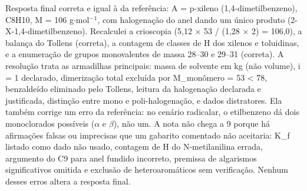 \documentclass{article}%
\begin{document}
Resposta final correta e igual à da referência: A = p{-}xileno (1,4{-}dimetilbenzeno), C8H10, M = 106 g$\cdot$mol$^{-}$$^{1}$, com halogenação do anel dando um único produto (2{-}X{-}1,4{-}dimetilbenzeno). Recalculei a crioscopia (5,12 $\times$ 53 / (1,28 $\times$ 2) = 106,0), a balança do Tollens (correta), a contagem de classes de H dos xilenos e toluidinas, e a enumeração de grupos monovalentes de massa 28--30 e 29--31 (correta). A resolução trata as armadilhas principais: massa de solvente em kg (não volume), i = 1 declarado, dimerização total excluída por M\_monômero = 53 < 78, benzaldeído eliminado pelo Tollens, leitura da halogenação declarada e justificada, distinção entre mono e poli{-}halogenação, e dados distratores. Ela também corrige um erro da referência: no cenário radicalar, o etilbenzeno dá dois monoclorados possíveis ($\alpha$ e $\beta$), não um. A nota não chega a 9 porque há afirmações falsas ou imprecisas que um gabarito comentado não aceitaria: K\_f listado como dado não usado, contagem de H do N{-}metilanilina errada, argumento do C9 para anel fundido incorreto, premissa de algarismos significativos omitida e exclusão de heteroaromáticos sem verificação. Nenhum desses erros altera a resposta final.%
$$
\end{document}
